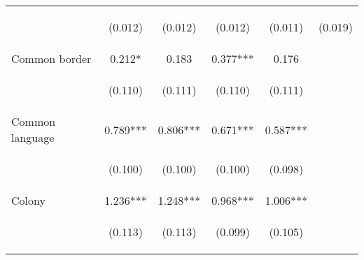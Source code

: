\begin{center}
\begin{tabular}{lccccc}
\vspace{4pt} & \begin{footnotesize}(0.012)\end{footnotesize} & \begin{footnotesize}(0.012)\end{footnotesize} & \begin{footnotesize}(0.012)\end{footnotesize} & \begin{footnotesize}(0.011)\end{footnotesize} & \begin{footnotesize}(0.019)\end{footnotesize} \\
Common border & 0.212* & 0.183 & 0.377*** & 0.176 &  \\
\vspace{4pt} & \begin{footnotesize}(0.110)\end{footnotesize} & \begin{footnotesize}(0.111)\end{footnotesize} & \begin{footnotesize}(0.110)\end{footnotesize} & \begin{footnotesize}(0.111)\end{footnotesize} & \begin{footnotesize}\end{footnotesize} \\
Common language & 0.789*** & 0.806*** & 0.671*** & 0.587*** &  \\
\vspace{4pt} & \begin{footnotesize}(0.100)\end{footnotesize} & \begin{footnotesize}(0.100)\end{footnotesize} & \begin{footnotesize}(0.100)\end{footnotesize} & \begin{footnotesize}(0.098)\end{footnotesize} & \begin{footnotesize}\end{footnotesize} \\
Colony & 1.236*** & 1.248*** & 0.968*** & 1.006*** &  \\
\vspace{4pt} & \begin{footnotesize}(0.113)\end{footnotesize} & \begin{footnotesize}(0.113)\end{footnotesize} & \begin{footnotesize}(0.099)\end{footnotesize} & \begin{footnotesize}(0.105)\end{footnotesize} & \begin{footnotesize}\end{footnotesize} \\

\end{tabular}
\end{center}
